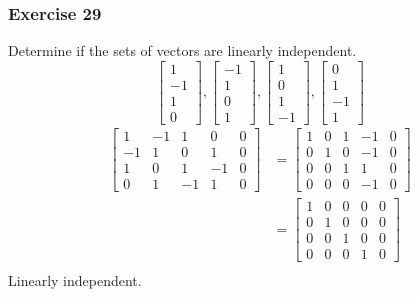 \documentclass[letterpaper, 12pt]{math}
\begin{document}
\subsubsection*{Exercise 29}
Determine if the sets of vectors are linearly independent.
\[ \begin{bmatrix}1 \\ -1 \\ 1 \\ 0\end{bmatrix},
  \begin{bmatrix}-1 \\ 1 \\ 0 \\ 1\end{bmatrix},
  \begin{bmatrix}1 \\ 0 \\ 1 \\ -1\end{bmatrix},
  \begin{bmatrix}0 \\ 1 \\ -1 \\ 1\end{bmatrix} \]
\begin{align*}
  \begin{bmatrix}
    1 & -1 & 1 & 0 & 0 \\
    -1 & 1 & 0 & 1 & 0 \\
    1 & 0 & 1 & -1 & 0 \\
    0 & 1 & -1 & 1 & 0
  \end{bmatrix} &= \begin{bmatrix}
    1 & 0 & 1 & -1 & 0 \\
    0 & 1 & 0 & -1 & 0 \\
    0 & 0 & 1 & 1 & 0 \\
    0 & 0 & 0 & -1 & 0
  \end{bmatrix} \\
  &= \begin{bmatrix}
    1 & 0 & 0 & 0 & 0 \\
    0 & 1 & 0 & 0 & 0 \\
    0 & 0 & 1 & 0 & 0 \\
    0 & 0 & 0 & 1 & 0
  \end{bmatrix} \\
\end{align*}
Linearly independent.
\end{document}
